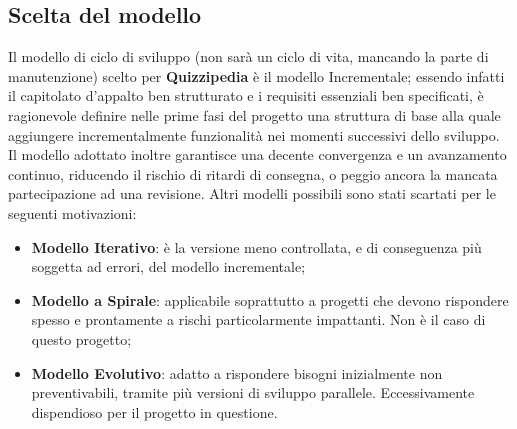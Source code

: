 \documentclass[a4paper,11pt]{article}
\begin{document}
	\subsection{Scelta del modello}
	Il modello di ciclo di sviluppo (non sarà un ciclo di vita, mancando la parte di manutenzione) scelto per \textbf{Quizzipedia} è il modello Incrementale; essendo infatti il capitolato d'appalto ben strutturato e i requisiti essenziali ben specificati, è ragionevole definire nelle prime fasi del progetto una struttura di base alla quale aggiungere incrementalmente funzionalità nei momenti successivi dello sviluppo. Il modello adottato inoltre garantisce una decente convergenza e un avanzamento continuo, riducendo il rischio di ritardi di consegna, o peggio ancora la mancata partecipazione ad una revisione.
Altri modelli possibili sono stati scartati per le seguenti motivazioni:
	\begin{itemize}
		\item \textbf{Modello Iterativo}: è la versione meno controllata, e di conseguenza più soggetta ad errori, del modello incrementale;
		\item\textbf{Modello a Spirale}: applicabile soprattutto a progetti che devono rispondere spesso e prontamente a rischi particolarmente impattanti. Non è il caso di questo progetto;
		\item\textbf{Modello Evolutivo}: adatto a rispondere bisogni inizialmente non preventivabili, tramite più versioni di sviluppo parallele. Eccessivamente dispendioso per il progetto in questione.
	\end{itemize}
	
	\newpage
	
\end{document}
